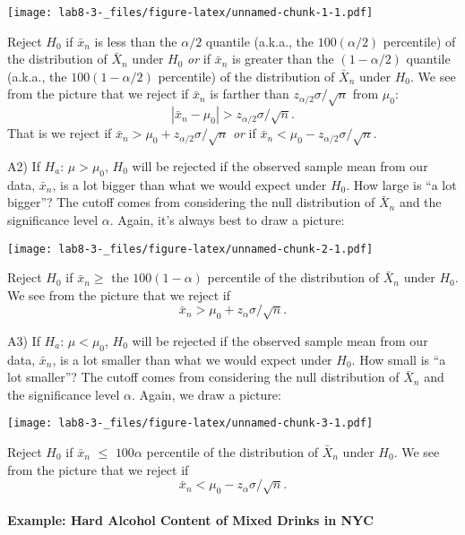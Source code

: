 \documentclass[]{article}
\let\oldparagraph\paragraph
\renewcommand{\paragraph}[1]{\oldparagraph{#1}\mbox{}}
\begin{document}
\texttt{[image: lab8-3-\_files/figure-latex/unnamed-chunk-1-1.pdf]}

Reject \(H_0\) if \(\bar x_n\) is less than the \(\alpha/2\) quantile
(a.k.a., the \(100(\alpha/2)\) percentile) of the distribution of
\(\bar X_n\) under \(H_0\) \emph{or} if \(\bar x_n\) is greater than the
\((1 - \alpha/2)\) quantile (a.k.a., the \(100(1 - \alpha/2)\)
percentile) of the distribution of \(\bar X_n\) under \(H_0\). We see
from the picture that we reject if \(\bar x_n\) is farther than
\(z_{\alpha/2}\sigma/\sqrt{n}\) from \(\mu_0\): \[
  |\bar x_n - \mu_0 | > z_{\alpha/2}\sigma/\sqrt{n}.
  \] That is we reject if
\(\bar x_n > \mu_0+z_{\alpha/2}\sigma/\sqrt{n}\) \emph{or} if
\(\bar x_n < \mu_0-z_{\alpha/2}\sigma/\sqrt{n}\).

A2) If \(H_{a}\): \(\mu > \mu_0\), \(H_0\) will be rejected if the
observed sample mean from our data, \(\bar x_n\), is a lot bigger than
what we would expect under \(H_0\). How large is ``a lot bigger''? The
cutoff comes from considering the null distribution of \(\bar X_n\) and
the significance level \(\alpha\). Again, it's always best to draw a
picture:

\texttt{[image: lab8-3-\_files/figure-latex/unnamed-chunk-2-1.pdf]}

Reject \(H_0\) if \(\bar x_n\ge\) the \(100(1 - \alpha)\) percentile of
the distribution of \(\bar X_n\) under \(H_0\). We see from the picture
that we reject if \[
  \bar x_n > \mu_0 + z_{\alpha}\sigma/\sqrt{n}.
  \]

A3) If \(H_{a}\): \(\mu < \mu_0\), \(H_0\) will be rejected if the
observed sample mean from our data, \(\bar x_n\), is a lot smaller than
what we would expect under \(H_0\). How small is ``a lot smaller''? The
cutoff comes from considering the null distribution of \(\bar X_n\) and
the significance level \(\alpha\). Again, we draw a picture:

\texttt{[image: lab8-3-\_files/figure-latex/unnamed-chunk-3-1.pdf]}

Reject \(H_0\) if \(\bar x_n\) \(\leq\) \(100\alpha\) percentile of the
distribution of \(\bar X_n\) under \(H_0\). We see from the picture that
we reject if \[
  \bar x_n < \mu_0 - z_{\alpha}\sigma/\sqrt{n}.
  \]

\hypertarget{example-hard-alcohol-content-of-mixed-drinks-in-nyc-1}{%
\paragraph{Example: Hard Alcohol Content of Mixed Drinks in
NYC}\label{example-hard-alcohol-content-of-mixed-drinks-in-nyc-1}}
\end{document}
